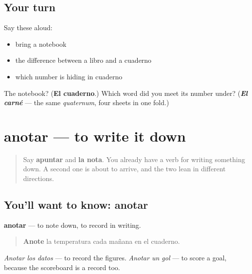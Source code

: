 \subsection*{Your turn}
Say these aloud:

\begin{itemize}
\raggedright
  \item bring a notebook
  \item the difference between a libro and a cuaderno
  \item which number is hiding in cuaderno
\end{itemize}

\begin{tcolorbox}[breakable,colback=teal!4,colframe=teal!35!black,title={Before you move on}]
The notebook? (\textbf{El cuaderno}.) Which word did you meet its number under? (\emph{\textbf{El carné}} — the same \emph{quaternum}, four sheets in one fold.)
\end{tcolorbox}
\section[anotar]{anotar — to write it down}

\label{lesson:ES-C465-anotar}



\begin{quote}
Say \textbf{apuntar} and \textbf{la nota}. You already have a verb for writing something down. A second one is about to arrive, and the two lean in different directions.
\end{quote}

\subsection*{You'll want to know: anotar}
\textbf{anotar} — to note down, to record in writing.

\begin{quote}
\textbf{Anote} la temperatura cada mañana en el cuaderno.
\end{quote}

\emph{Anotar los datos} — to record the figures. \emph{Anotar un gol} — to score a goal, because the scoreboard is a record too.

